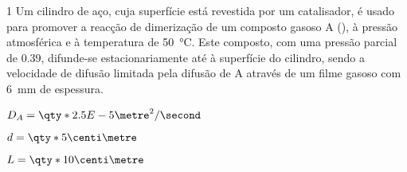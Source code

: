 \documentclass[\mainfilename]{subfiles}
\begin{document}
\begin{exampleBox}1{ %
    Um cilindro de aço, cuja superfície está revestida por um catalisador, é usado para promover a reacção de dimerização de um composto gasoso A (), à pressão atmosférica e à temperatura de \qty*{50}{\celsius}. Este composto, com uma pressão parcial de \qty*{0.39}{\atm}, difunde-se estacionariamente até à superfície do cilindro, sendo a velocidade de difusão limitada pela difusão de A através de um filme gasoso com \qty*{6}{\milli\metre} de espessura.
} %
    
    \begin{itemize}
        \begin{multicols}{3}
            \item \(D_A=\qty*{2.5E-5}{\metre^2/\second}\)
            \item \(d=\qty*{5}{\centi\metre}\)
            \item \(L=\qty*{10}{\centi\metre}\)
        \end{multicols}
    \end{itemize}


\end{exampleBox}
\end{document}

